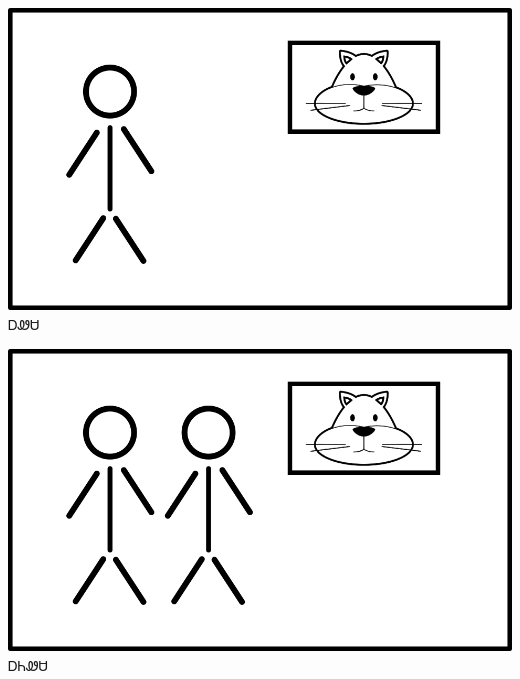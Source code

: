 \documentclass[avery8371]{flashcards}%
\begin{document}
    \begin{flashcard}{
        \includegraphics[width=0.95\columnwidth,height=.51\columnwidth,keepaspectratio]{../artwork/flags/awesa-flag}
    }
        \Huge ᎠᏪᏌ
    \end{flashcard}
    \begin{flashcard}{
        \includegraphics[width=0.95\columnwidth,height=.51\columnwidth,keepaspectratio]{../artwork/flags/aniwesa-flag}
    }
        \Huge ᎠᏂᏪᏌ
    \end{flashcard}

\end{document}

